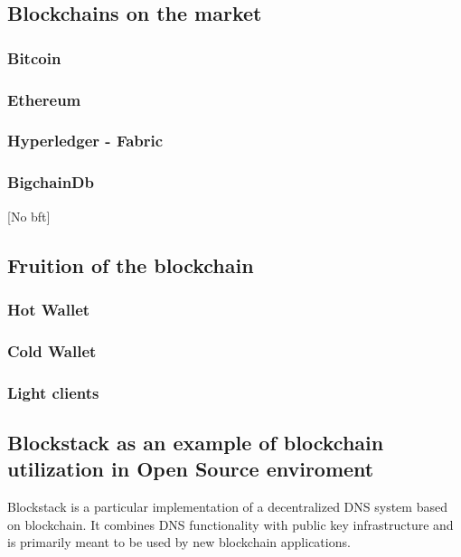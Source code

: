 \subsection{Blockchains on the market}

\subsubsection{Bitcoin}

\subsubsection{Ethereum}

\subsubsection{Hyperledger - Fabric}

\subsubsection{BigchainDb}
[No bft]



\subsection{Fruition of the blockchain}

\subsubsection{Hot Wallet}
\subsubsection{Cold Wallet}

\subsubsection{Light clients}

\subsection{Blockstack as an example of blockchain utilization in Open Source enviroment}
Blockstack is a particular implementation of a decentralized DNS system based on blockchain. It combines DNS functionality with public key infrastructure and is primarily meant to be used by new blockchain applications.

